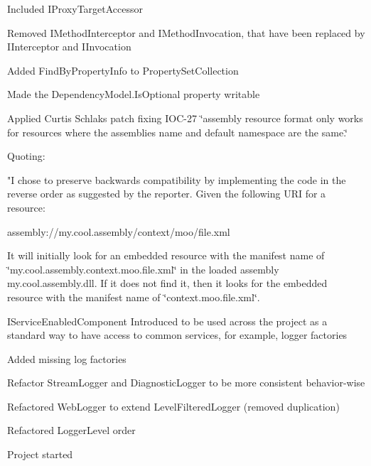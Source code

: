 \begin{DoxyItemize}
\item Included I\+Proxy\+Target\+Accessor
\item Removed I\+Method\+Interceptor and I\+Method\+Invocation, that have been replaced by I\+Interceptor and I\+Invocation
\item Added Find\+By\+Property\+Info to Property\+Set\+Collection
\item Made the Dependency\+Model.\+Is\+Optional property writable
\item Applied Curtis Schlak\textquotesingle{}s patch fixing I\+O\+C-\/27 \char`\"{}assembly resource format only works for resources where the assemblies name and default namespace are the same.\char`\"{}

Quoting\+:

"I chose to preserve backwards compatibility by implementing the code in the reverse order as suggested by the reporter. Given the following U\+RI for a resource\+:

assembly\+://my.cool.\+assembly/context/moo/file.xml

It will initially look for an embedded resource with the manifest name of \char`\"{}my.\+cool.\+assembly.\+context.\+moo.\+file.\+xml\char`\"{} in the loaded assembly my.\+cool.\+assembly.\+dll. If it does not find it, then it looks for the embedded resource with the manifest name of \char`\"{}context.\+moo.\+file.\+xml\char`\"{}.
\item I\+Service\+Enabled\+Component Introduced to be used across the project as a standard way to have access to common services, for example, logger factories
\item Added missing log factories
\item Refactor Stream\+Logger and Diagnostic\+Logger to be more consistent behavior-\/wise
\item Refactored Web\+Logger to extend Level\+Filtered\+Logger (removed duplication)
\item Refactored Logger\+Level order
\item Project started 
\end{DoxyItemize}
